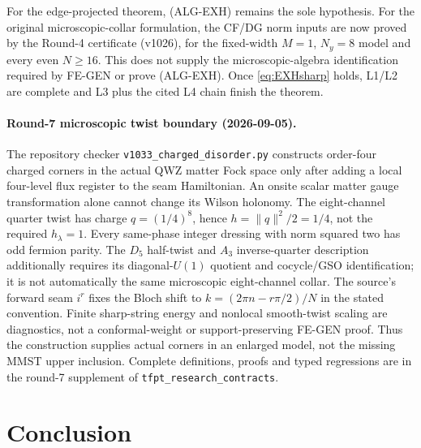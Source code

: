 \documentclass[11pt]{article}
\theoremstyle{remark}
\begin{document}
\begin{center}
{\begin{minipage}{0.92\textwidth}
\smallskip
For the edge-projected theorem, \textup{(ALG-EXH)} remains the sole hypothesis.
For the original microscopic-collar formulation, the CF/DG norm inputs are
now proved by the Round-4 certificate (v1026), for the fixed-width
$M=1$, $N_y=8$ model and every even $N\ge16$.
This does not supply the microscopic-algebra identification required by
FE-GEN or prove \textup{(ALG-EXH)}.
Once \eqref{eq:EXHsharp} holds, L1/L2 are complete and L3 plus the cited
L4 chain finish the theorem.
\end{minipage}}
\end{center}

\paragraph{Round-7 microscopic twist boundary (2026-09-05).}
The repository checker \texttt{v1033\_charged\_disorder.py} constructs
order-four charged corners in the actual QWZ matter Fock space only after
adding a local four-level flux register to the seam Hamiltonian.
An onsite scalar matter gauge transformation alone cannot change its
Wilson holonomy. The eight-channel quarter twist has charge
$q=(1/4)^8$, hence $h=\lVert q\rVert^2/2=1/4$, not the required
$h_\lambda=1$. Every same-phase integer dressing with norm squared two
has odd fermion parity. The $D_5$ half-twist and $A_3$ inverse-quarter
description additionally requires its diagonal-$U(1)$ quotient and
cocycle/GSO identification; it is not automatically the same microscopic
eight-channel collar. The source's forward seam $i^r$ fixes the Bloch
shift to $k=(2\pi n-r\pi/2)/N$ in the stated convention.
Finite sharp-string energy and nonlocal smooth-twist scaling are
diagnostics, not a conformal-weight or support-preserving FE-GEN proof.
Thus the construction supplies actual corners in an enlarged model,
not the missing MMST upper inclusion. Complete definitions, proofs and
typed regressions are in the round-7 supplement of
\texttt{tfpt\_research\_contracts}.

\section*{Conclusion}
\end{document}
